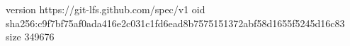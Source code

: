 version https://git-lfs.github.com/spec/v1
oid sha256:c9f7bf75af0ada416e2c031c1fd6ead8b7575151372abf58d1655f5245d16c83
size 349676
